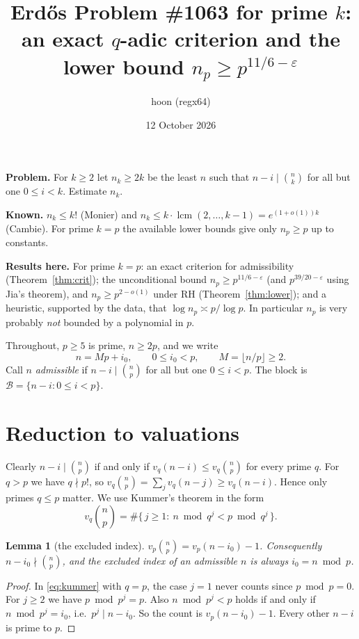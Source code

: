 \documentclass[11pt]{article}
\title{Erd\H{o}s Problem \#1063 for prime $k$:\\ an exact $q$-adic criterion and the lower bound $n_p \ge p^{11/6-\varepsilon}$}
\author{hoon (regx64)}
\date{12 October 2026}
\newtheorem{lemma}[theorem]{Lemma}
\theoremstyle{remark}
\DeclareMathOperator{\lcm}{lcm}
\begin{document}
\maketitle

\noindent\textbf{Problem.} For $k\ge 2$ let $n_k\ge 2k$ be the least $n$ such that $n-i\mid\binom{n}{k}$ for all but one $0\le i<k$. Estimate $n_k$.

\noindent\textbf{Known.} $n_k\le k!$ (Monier) and $n_k\le k\cdot\lcm(2,\dots,k-1)=e^{(1+o(1))k}$ (Cambie). For prime $k=p$ the available lower bounds give only $n_p\ge p$ up to constants.

\noindent\textbf{Results here.} For prime $k=p$: an exact criterion for admissibility (Theorem~\ref{thm:crit}); the unconditional bound $n_p\ge p^{11/6-\varepsilon}$ (and $p^{39/20-\varepsilon}$ using Jia's theorem), and $n_p\ge p^{2-o(1)}$ under RH (Theorem~\ref{thm:lower}); and a heuristic, supported by the data, that $\log n_p\asymp p/\log p$. In particular $n_p$ is very probably \emph{not} bounded by a polynomial in $p$.

Throughout, $p\ge 5$ is prime, $n\ge 2p$, and we write
\[
n = Mp+i_0,\qquad 0\le i_0<p,\qquad M=\lfloor n/p\rfloor\ge 2 .
\]
Call $n$ \emph{admissible} if $n-i\mid\binom np$ for all but one $0\le i<p$. The block is $\mathcal B=\{n-i:0\le i<p\}$.

\section{Reduction to valuations}

Clearly $n-i\mid\binom np$ if and only if $v_q(n-i)\le v_q\binom np$ for every prime $q$. For $q>p$ we have $q\nmid p!$, so $v_q\binom np=\sum_{j}v_q(n-j)\ge v_q(n-i)$. Hence only primes $q\le p$ matter. We use Kummer's theorem in the form
\begin{equation}\label{eq:kummer}
v_q\binom np=\#\{\,j\ge1:\ n\bmod q^j< p\bmod q^j\,\}.
\end{equation}

\begin{lemma}[the excluded index]\label{lem:p}
$v_p\binom np=v_p(n-i_0)-1$. Consequently $n-i_0\nmid\binom np$, and the excluded index of an admissible $n$ is always $i_0=n\bmod p$.
\end{lemma}
\begin{proof}
In \eqref{eq:kummer} with $q=p$, the case $j=1$ never counts since $p\bmod p=0$. For $j\ge2$ we have $p\bmod p^j=p$. Also $n\bmod p^j<p$ holds if and only if $n\bmod p^j=i_0$, i.e.\ $p^j\mid n-i_0$. So the count is $v_p(n-i_0)-1$. Every other $n-i$ is prime to $p$.
\end{proof}
\end{document}
